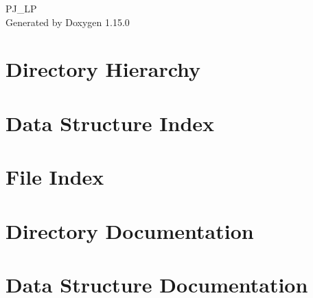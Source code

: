 \documentclass[twoside]{book}
\newcommand{\+}{\discretionary{\mbox{\scriptsize$\hookleftarrow$}}{}{}}
\newcommand{\clearemptydoublepage}{%
    \newpage{\pagestyle{empty}\cleardoublepage}%
  }
\begin{document}
  \raggedbottom
    \hypersetup{pageanchor=false,
                bookmarksnumbered=true,
                pdfencoding=unicode
               }
  \begin{titlepage}
  \vspace*{7cm}
  \begin{center}%
  {\Large PJ\+\_\+\+LP}\\
  \vspace*{1cm}
  {\large Generated by Doxygen 1.15.0}\\
  \end{center}
  \end{titlepage}
  \clearemptydoublepage
  \tableofcontents
  \clearemptydoublepage
  \hypersetup{pageanchor=true}
\chapter{Directory Hierarchy}

\chapter{Data Structure Index}

\chapter{File Index}

\chapter{Directory Documentation}


\chapter{Data Structure Documentation}














\end{document}
